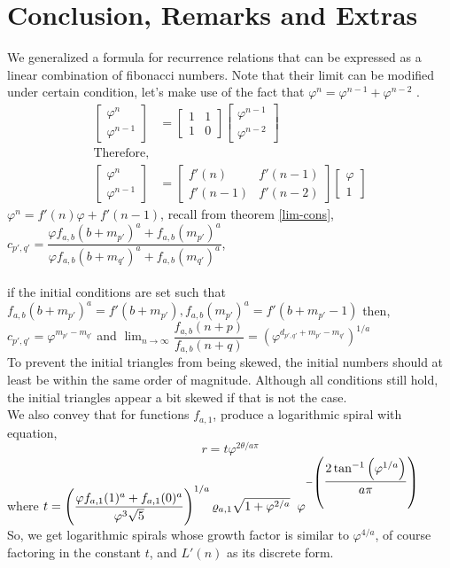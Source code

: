 \documentclass[preprint,12pt]{elsarticle}
\begin{document}
\section{Conclusion, Remarks and Extras}
We generalized a formula for recurrence relations that can be expressed as a linear combination of fibonacci numbers. Note that their limit can be modified under certain condition, let's make use of the fact that $\varphi^n = \varphi^{n-1}+\varphi^{n-2}$ \cite{Powerp}.\\
\begin{align*}
	\begin{bmatrix}\varphi^n \\\varphi^{n-1}\end{bmatrix}
	&=
	\begin{bmatrix}1     & 1       \\1 & 0\end{bmatrix}
	\begin{bmatrix}\varphi^{n-1}\\\varphi^{n-2}\end{bmatrix}\\
	\text{Therefore,}\\
	\begin{bmatrix}\varphi^n \\\varphi^{n-1}\end{bmatrix}
	&=
	\begin{bmatrix}f'(n) & f'(n-1) \\f'(n-1) & f'(n-2)\end{bmatrix}
	\begin{bmatrix}\varphi\\1\end{bmatrix}
\end{align*}
$\varphi^n = f'(n)\varphi+f'(n-1)$, recall from theorem \ref{lim-cons}, $c_{p',q'} = \dfrac{\varphi f_{a,b}(b+m_{p'})^a + f_{a,b}(m_{p'})^a}{\varphi f_{a,b}(b+m_{q'})^a + f_{a,b}(m_{q'})^a}$,\\\\
if the initial conditions are set such that $f_{a,b}(b+m_{p'})^a =f'(b+m_{p'}), f_{a,b}(m_{p'})^a = f'(b+m_{p'} -1)$ then, $c_{p',q'} = \varphi^{m_{p'}-m_{q'}}$ and $\lim_{n \to \infty} \dfrac{f_{a,b}(n + p)}{f_{a,b}(n + q)} = \left(\varphi^{d_{p',q'}+m_{p'}-m_{q'}}\right)^{1/a}$\\
To prevent the initial triangles from being skewed, the initial numbers should at least be within the same order of magnitude. Although all conditions still hold, the initial triangles appear a bit skewed if that is not the case.\\
We also convey that for functions $f_{a,1}$, produce a logarithmic spiral with equation, $$r = t\varphi^{2\theta/a\pi}$$ where $t=\left(\dfrac{\varphi f_{a,1}(1)^a+f_{a,1}(0)^a}{\varphi^{3}\sqrt{5}}\right)^{1/a}\varrho_{a,1}\sqrt{1 + \varphi^{2/a}}\hspace{2mm}\varphi^{-\left(\dfrac{ 2\tan^{-1}{\left(\varphi^{1/a}\right)}}{a\pi}\right)}$\\
So, we get logarithmic spirals whose growth factor is similar to $\varphi^{4/a}$, of course factoring in the constant $t$, and $L'(n)$ as its discrete form.\\




\end{document}

